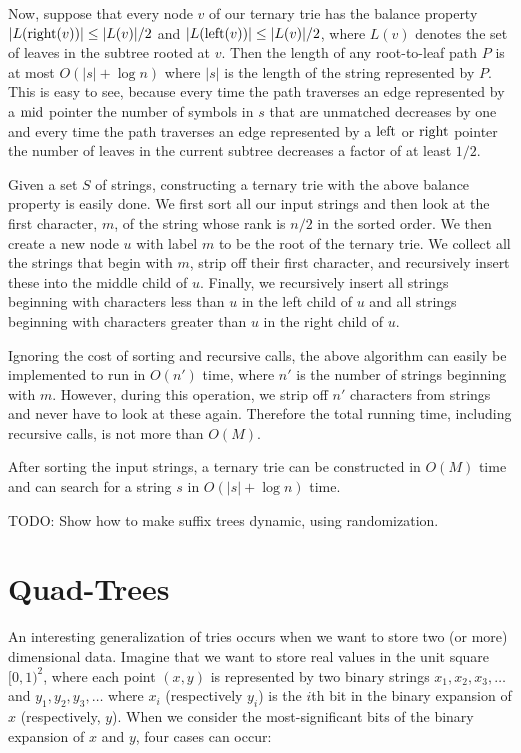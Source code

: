 Now, suppose that every node $v$ of our ternary trie has the balance
property $|L(\mathrm{right}(v))|\le |L(v)|/2$ and $|L(\mathrm{left}(v))|\le |L(v)|/2$,
where $L(v)$ denotes the set of leaves in the subtree rooted at $v$.
Then the length of any root-to-leaf path $P$ is at most $O(|s|+\log
n)$ where $|s|$ is the length of the string represented by $P$.  This
is easy to see, because every time the path traverses an edge
represented by a $\mathrm{mid}$ pointer the number of symbols in $s$ that are
unmatched decreases by one and every time the path traverses an edge
represented by a $\mathrm{left}$ or $\mathrm{right}$ pointer the number of leaves in the
current subtree decreases a factor of at least $1/2$.

Given a set $S$ of strings, constructing a ternary trie with the above
balance property is easily done.  We first sort all our input strings
and then look at the first character, $m$, of the string whose rank is
$n/2$ in the sorted order.  We then create a new node $u$ with label
$m$ to be the root of the ternary trie.  We collect all the strings
that begin with $m$, strip off their first character, and recursively
insert these into the middle child of $u$.  Finally, we recursively
insert all strings beginning with characters less than $u$ in the left
child of $u$ and all strings beginning with characters greater than
$u$ in the right child of $u$.

Ignoring the cost of sorting and recursive calls, the above algorithm
can easily be implemented to run in $O(n')$ time, where $n'$ is the
number of strings beginning with $m$.  However, during this operation,
we strip off $n'$ characters from strings and never have to look at
these again.  Therefore the total running time, including recursive
calls, is not more than $O(M)$.

\begin{thm}
After sorting the input strings, a ternary trie can be constructed in
$O(M)$ time and can search for a string $s$ in $O(|s|+\log n)$ time.
\end{thm}

TODO: Show how to make suffix trees dynamic, using randomization.

\section{Quad-Trees}

An interesting generalization of tries occurs when we want to store
two (or more) dimensional data.  Imagine that we want to store real
values in the unit square $[0,1)^2$, where each point $(x,y)$ is
represented by two binary strings $x_1,x_2,x_3,\ldots$ and
$y_1,y_2,y_3,\ldots$ where $x_i$ (respectively $y_i$) is the
$i$th bit in the binary expansion of $x$ (respectively, $y$).  When we
consider the most-significant bits of the binary expansion of $x$ and
$y$, four cases can occur:



